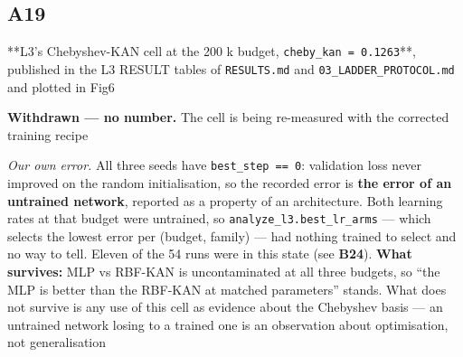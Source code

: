 \documentclass[10pt]{article}
\begin{document}
\subsection*{A19}\label{led:A19}
\begin{description}[leftmargin=0pt,itemsep=1pt]
\item[Claim withdrawn.] **L3's Chebyshev-KAN cell at the 200 k budget, \texttt{cheby\_kan = 0.1263}**, published in the L3 RESULT tables of \texttt{RESULTS.md} and \texttt{03\_LADDER\_PROTOCOL.md} and plotted in Fig6
\item[Replaced with.] \textbf{Withdrawn --- no number.} The cell is being re-measured with the corrected training recipe
\item[Why it was wrong.] \emph{Our own error.} All three seeds have \texttt{best\_step == 0}: validation loss never improved on the random initialisation, so the recorded error is \textbf{the error of an untrained network}, reported as a property of an architecture. Both learning rates at that budget were untrained, so \texttt{analyze\_l3.best\_lr\_arms} --- which selects the lowest error per (budget, family) --- had nothing trained to select and no way to tell. Eleven of the 54 runs were in this state (see \textbf{B24}). \textbf{What survives:} MLP vs RBF-KAN is uncontaminated at all three budgets, so ``the MLP is better than the RBF-KAN at matched parameters'' stands. What does not survive is any use of this cell as evidence about the Chebyshev basis --- an untrained network losing to a trained one is an observation about optimisation, not generalisation
\end{description}
\end{document}
